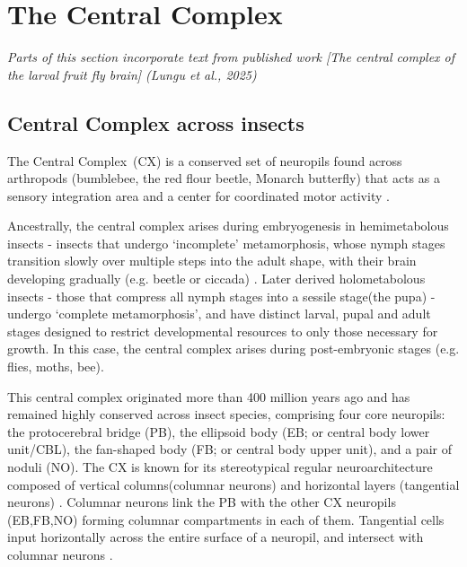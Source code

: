 \section{The Central Complex}
\label{CXAdultIntro}
\textit{Parts of this section incorporate text from published work [The central complex of the larval fruit fly brain] (Lungu et al., 2025)}

    \subsection{Central Complex across insects}
        The Central Complex~(CX) is a conserved set of neuropils found across arthropods (bumblebee, the red flour beetle, Monarch butterfly) that acts as a sensory integration area and a center for coordinated motor activity \citep{PfeifferHomberg2014, turnerevans2016CX, heinze2024variations}.

        Ancestrally, the central complex arises during embryogenesis in hemimetabolous insects - insects that undergo ‘incomplete’ metamorphosis, whose nymph stages transition slowly over multiple steps into the adult shape, with their brain developing gradually (e.g. beetle or ciccada) \citep{andrade2019developmentally}.
        Later derived holometabolous insects - those that compress all nymph stages into a sessile stage(the pupa) -  undergo ‘complete metamorphosis’, and have distinct larval, pupal and adult stages designed to restrict developmental resources to only those necessary for growth. In this case, the central complex arises during  post-embryonic stages (e.g. flies, moths, bee).

        This central complex originated more than 400 million years ago and has remained highly conserved across insect species, comprising four core neuropils: the protocerebral bridge (PB), the ellipsoid body (EB; or central body lower unit/CBL), the fan-shaped body (FB; or central body upper unit), and a pair of noduli (NO). The CX is known for its stereotypical regular neuroarchitecture composed of vertical columns(columnar neurons) and horizontal layers (tangential neurons) \citep{heinze2024variations}.  Columnar neurons link the PB with the other CX neuropils (EB,FB,NO) forming columnar compartments in each of them. Tangential cells input horizontally across the entire surface of a neuropil, and intersect with columnar neurons \citep{honkanen2019insect}.  
  


